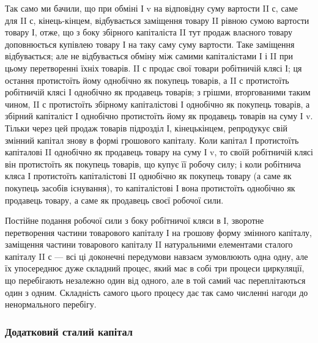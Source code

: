 Так само ми бачили, що при обміні І v на відповідну суму вартости
II с, саме для II с, кінець-кінцем, відбувається заміщення товару II
рівною сумою вартости товару І, отже, що з боку збірного капіталіста
II тут продаж власного товару доповнюється купівлею товару І на
таку саму суму вартости. Таке заміщення відбувається; але не відбувається
обміну між самими капіталістами І і II при цьому перетворенні
їхніх товарів. II с продає свої товари робітничій клясі І; ця остання
протистоїть йому однобічно як покупець товарів, а II с протистоїть робітничій
клясі І однобічно як продавець товарів; з грішми, вторгованими
таким чином, II с протистоїть збірному капіталістові І однобічно як покупець
товарів, а збірний капіталіст І однобічно протистоїть йому як продавець
товарів на суму І v. Тільки через цей продаж товарів підрозділ І, кінецькінцем,
репродукує свій змінний капітал знову в формі грошового капіталу.
Коли капітал І протистоїть капіталові II однобічно як продавець
товару на суму І v, то своїй робітничій клясі він протистоїть як покупець
товарів, що купує її робочу силу; і коли робітнича кляса І протистоїть
капіталістові II однобічно як покупець товару (а саме як покупець
засобів існування), то капіталістові І вона протистоїть однобічно як продавець
товару, а саме як продавець своєї робочої сили.

Постійне подання робочої сили з боку робітничої кляси в І, зворотне
перетворення частини товарового капіталу І на грошову форму змінного
капіталу, заміщення частини товарового капіталу II натуральними елементами
сталого капіталу II с — всі ці доконечні передумови навзаєм зумовлюють
одна одну, але їх упосереднює дуже складний процес, який
має в собі три процеси циркуляції, що перебігають незалежно один від
одного, але в той самий час переплітаються один з одним. Складність самого
цього процесу дає так само численні нагоди до ненормального перебігу.

\subsubsection{Додатковий сталий капітал}


